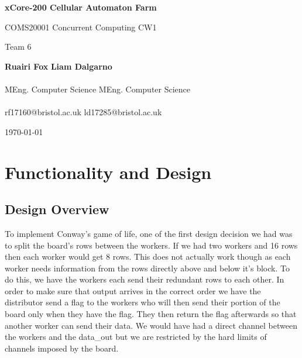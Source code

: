 \documentclass{article}
\begin{document}
    \begin{titlepage}
        \begin{center}
            \vspace*{2cm}
            
            {\huge \textbf{xCore-200 Cellular Automaton Farm}}
            
            \vspace{0.5cm}
            
            {\Large COMS20001 Concurrent Computing CW1}
            
            \vspace{0.5cm}
            
            {\large Team 6}
            
            \vspace{1cm}
            
            \hspace*{1cm} {\Large \textbf{Ruairi Fox}} \hfill {\Large \textbf{Liam Dalgarno}} \hspace*{1cm} \\~\\[-0.5em]
            \hspace*{1cm} MEng. Computer Science \hfill MEng. Computer Science  \hspace*{1cm} \\~\\[-1em]
            \hspace*{1cm} rf17160@bristol.ac.uk  \hfill ld17285@bristol.ac.uk  \hspace*{1cm} 
            
            \vspace{1cm}
            
            {\large \today}
        \end{center}
    \end{titlepage}

    \section{Functionality and Design}
    \subsection{Design Overview}
    To implement Conway's game of life, one of the first design decision we had was to split the board's rows between the workers. If we had two workers and 16 rows then each worker would get 8 rows. This does not actually work though as each worker needs information from the rows directly above and below it's block. To do this, we have the workers each send their redundant rows to each other. In order to make sure that output arrives in the correct order we have the distributor send a flag to the workers who will then send their portion of the board only when they have the flag. They then return the flag afterwards so that another worker can send their data. We would have had a direct channel between the workers and the data\_out but we are restricted by the hard limits of channels imposed by the board. 
\end{document}
